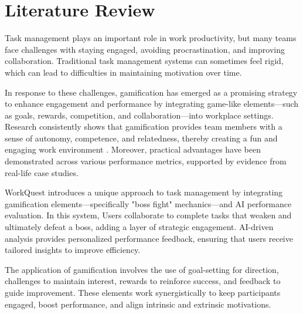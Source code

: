 

\section{Literature Review}
\label{section:literature-review}
    Task management plays an important role in work productivity, but many teams face challenges with staying engaged, avoiding procrastination, and improving collaboration. Traditional task management systems can sometimes feel rigid, which can lead to difficulties in maintaining motivation over time.

    In response to these challenges, gamification has emerged as a promising strategy to enhance engagement and performance by integrating game-like elements—such as goals, rewards, competition, and collaboration—into workplace settings. Research consistently shows that gamification provides team members with a sense of autonomy, competence, and relatedness, thereby creating a fun and engaging work environment \cite{ncbi:pmc10905147}. Moreover, practical advantages have been demonstrated across various performance metrics, supported by evidence from real-life case studies. \cite{Employee:Gamification}

    WorkQuest introduces a unique approach to task management by integrating gamification elements—specifically "boss fight" mechanics—and AI performance evaluation. In this system, Users collaborate to complete tasks that weaken and ultimately defeat a boss, adding a layer of strategic engagement. AI-driven analysis provides personalized performance feedback, ensuring that users receive tailored insights to improve efficiency.

    The application of gamification involves the use of goal-setting for direction, challenges to maintain interest, rewards to reinforce success, and feedback to guide improvement. These elements work synergistically to keep participants engaged, boost performance, and align intrinsic and extrinsic motivations. \cite{Game:Reward}

